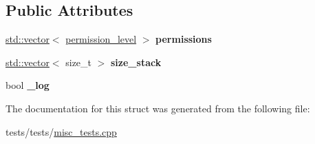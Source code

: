 \subsection*{Public Attributes}
\begin{DoxyCompactItemize}
\item 
\mbox{\label{structaacio_1_1permission__visitor_a0f5d9bf3a977898698b1593276e9afeb}} 
\mbox{\hyperlink{classstd_1_1vector}{std\+::vector}}$<$ \mbox{\hyperlink{structaacio_1_1permission__level}{permission\+\_\+level}} $>$ {\bfseries permissions}
\item 
\mbox{\label{structaacio_1_1permission__visitor_a3e18b67f88a593f4b0457c2c3b007ac2}} 
\mbox{\hyperlink{classstd_1_1vector}{std\+::vector}}$<$ size\+\_\+t $>$ {\bfseries size\+\_\+stack}
\item 
\mbox{\label{structaacio_1_1permission__visitor_a343f8e0e2d5b307bfa96cefe11f1501b}} 
bool {\bfseries \+\_\+log}
\end{DoxyCompactItemize}


The documentation for this struct was generated from the following file\+:\begin{DoxyCompactItemize}
\item 
tests/tests/\mbox{\hyperlink{misc__tests_8cpp}{misc\+\_\+tests.\+cpp}}\end{DoxyCompactItemize}
